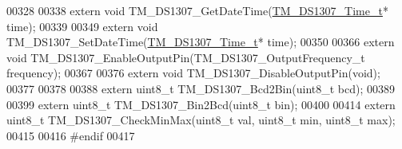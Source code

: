 \begin{DoxyCode}
00328 
00338 \textcolor{keyword}{extern} \textcolor{keywordtype}{void} TM\_DS1307\_GetDateTime(\hyperlink{struct_t_m___d_s1307___time__t}{TM\_DS1307\_Time\_t}* time);
00339 
00349 \textcolor{keyword}{extern} \textcolor{keywordtype}{void} TM\_DS1307\_SetDateTime(\hyperlink{struct_t_m___d_s1307___time__t}{TM\_DS1307\_Time\_t}* time);
00350 
00366 \textcolor{keyword}{extern} \textcolor{keywordtype}{void} TM\_DS1307\_EnableOutputPin(TM\_DS1307\_OutputFrequency\_t frequency);
00367 
00376 \textcolor{keyword}{extern} \textcolor{keywordtype}{void} TM\_DS1307\_DisableOutputPin(\textcolor{keywordtype}{void});
00377 
00378 
00388 \textcolor{keyword}{extern} uint8\_t TM\_DS1307\_Bcd2Bin(uint8\_t bcd);
00389 
00399 \textcolor{keyword}{extern} uint8\_t TM\_DS1307\_Bin2Bcd(uint8\_t bin);
00400 
00414 \textcolor{keyword}{extern} uint8\_t TM\_DS1307\_CheckMinMax(uint8\_t val, uint8\_t min, uint8\_t max);
00415 
00416 \textcolor{preprocessor}{#endif}
00417 
\end{DoxyCode}
